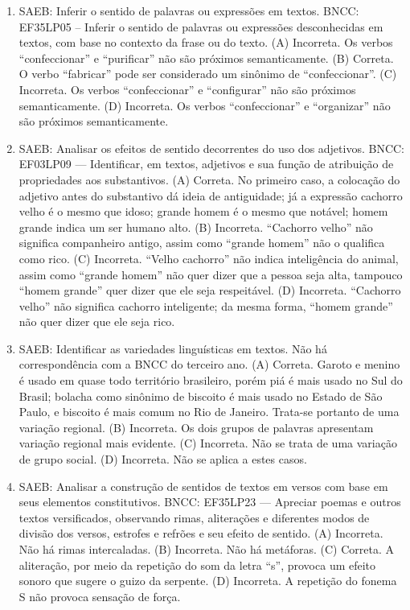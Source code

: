 \begin{enumerate}
\item
SAEB: Inferir o sentido de palavras ou expressões em textos.
BNCC: EF35LP05 -- Inferir o sentido de palavras ou expressões desconhecidas em textos, com base no
contexto da frase ou do texto.
(A) Incorreta. Os verbos ``confeccionar'' e ``purificar'' não são próximos semanticamente.
(B) Correta. O verbo ``fabricar'' pode ser considerado um sinônimo de ``confeccionar''.
(C) Incorreta. Os verbos ``confeccionar'' e ``configurar'' não são próximos semanticamente.
(D) Incorreta. Os verbos ``confeccionar'' e ``organizar'' não são próximos semanticamente.

\item
SAEB: Analisar os efeitos de sentido decorrentes do uso dos adjetivos. 
BNCC: EF03LP09 --- Identificar, em textos, adjetivos e sua função de atribuição de propriedades aos substantivos. 
(A) Correta. No primeiro caso, a colocação do adjetivo antes do substantivo dá ideia de antiguidade; já a expressão cachorro velho é o mesmo que idoso; grande homem é o mesmo que notável; homem grande indica um ser humano alto. 
(B) Incorreta. ``Cachorro velho'' não significa companheiro antigo, assim como ``grande homem'' não o qualifica como rico. 
(C) Incorreta. ``Velho cachorro'' não indica inteligência do animal, assim como ``grande homem'' não quer dizer que a pessoa seja alta, tampouco ``homem grande'' quer dizer que ele seja respeitável. 
(D) Incorreta. ``Cachorro velho'' não significa cachorro inteligente; da mesma forma, ``homem grande'' não quer dizer que ele seja rico.

\item
SAEB: Identificar as variedades linguísticas em textos. Não há correspondência com a BNCC do terceiro ano. 
(A) Correta. Garoto e menino é usado em quase todo território brasileiro, porém piá é mais usado no Sul do Brasil; bolacha como sinônimo de biscoito é mais usado no Estado de São Paulo, e biscoito é mais comum no Rio de Janeiro. Trata-se portanto de uma variação regional.  
(B) Incorreta. Os dois grupos de palavras apresentam variação regional mais evidente.
(C) Incorreta. Não se trata de uma variação de grupo social.  
(D) Incorreta. Não se aplica a estes casos.

\item
SAEB: Analisar a construção de sentidos de textos em versos com base em seus elementos constitutivos. 
BNCC: EF35LP23 --- Apreciar poemas e outros textos versificados, observando rimas, aliterações e diferentes modos de divisão dos versos, estrofes e refrões e seu efeito de sentido. 
(A) Incorreta. Não há rimas intercaladas. 
(B) Incorreta. Não há metáforas. 
(C) Correta. A aliteração, por meio da repetição do som da letra ``s'', provoca um efeito sonoro que sugere o guizo da serpente. 
(D) Incorreta. A repetição do fonema S não provoca sensação de força.


\end{enumerate}
